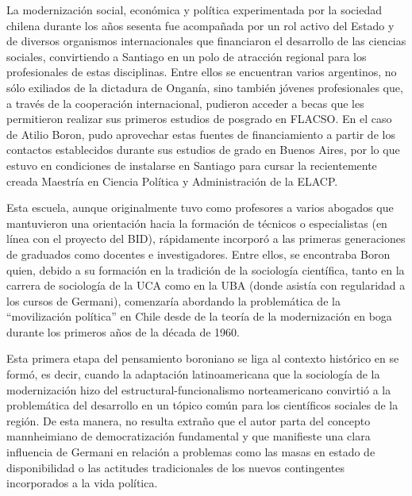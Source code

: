 La modernización social, económica y política experimentada por la sociedad chilena durante los años sesenta fue acompañada por un rol activo del Estado y de diversos organismos internacionales que financiaron el desarrollo de las ciencias sociales, convirtiendo a Santiago en un polo de atracción regional para los profesionales de estas disciplinas. Entre ellos se encuentran varios argentinos, no sólo exiliados de la dictadura de Onganía, sino también jóvenes profesionales que, a través de la cooperación internacional, pudieron acceder a becas que les permitieron realizar sus primeros estudios de posgrado en FLACSO. En el caso de Atilio Boron, pudo aprovechar estas fuentes de financiamiento a partir de los contactos establecidos durante sus estudios de grado en Buenos Aires, por lo que estuvo en condiciones de instalarse en Santiago para cursar la recientemente creada Maestría en Ciencia Política y Administración de la ELACP.

Esta escuela, aunque originalmente tuvo como profesores a varios abogados que mantuvieron una orientación hacia la formación de técnicos o especialistas (en línea con el proyecto del BID), rápidamente incorporó a las primeras generaciones de graduados como docentes e investigadores. Entre ellos, se encontraba Boron quien, debido a su formación en la tradición de la sociología científica, tanto en la carrera de sociología de la UCA como en la UBA (donde asistía con regularidad a los cursos de Germani), comenzaría abordando la problemática de la \enquote{movilización política} en Chile desde de la teoría de la modernización en boga durante los primeros años de la década de 1960.

Esta primera etapa del pensamiento boroniano se liga al contexto histórico en se formó, es decir, cuando la adaptación latinoamericana que la sociología de la modernización hizo del estructural-funcionalismo norteamericano convirtió a la problemática del desarrollo en un tópico común para los científicos sociales de la región. De esta manera, no resulta extraño que el autor parta del concepto mannheimiano de democratización fundamental y que manifieste una clara influencia de Germani en relación a problemas como las masas en estado de disponibilidad o las actitudes tradicionales de los nuevos contingentes incorporados a la vida política.

